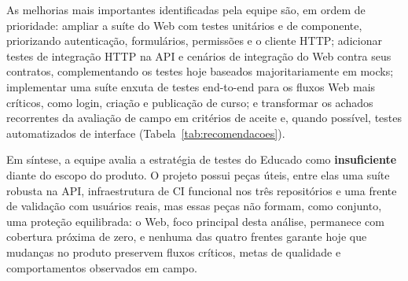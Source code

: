 As melhorias mais importantes identificadas pela equipe são, em ordem de
prioridade: ampliar a suíte do Web com testes unitários e de componente,
priorizando autenticação, formulários, permissões e o cliente HTTP;
adicionar testes de integração HTTP na API e cenários de integração do
Web contra seus contratos, complementando os testes hoje baseados
majoritariamente em mocks; implementar uma suíte enxuta de testes
end-to-end para os fluxos Web mais críticos, como login, criação e
publicação de curso; e transformar os achados recorrentes da avaliação
de campo em critérios de aceite e, quando possível, testes automatizados
de interface (Tabela~\ref{tab:recomendacoes}).

Em síntese, a equipe avalia a estratégia de testes do Educado como
\textbf{insuficiente} diante do escopo do produto. O projeto possui
peças úteis, entre elas uma suíte robusta na API, infraestrutura de CI
funcional nos três repositórios e uma frente de validação com usuários
reais, mas essas peças não formam, como conjunto, uma proteção
equilibrada: o Web, foco principal desta análise, permanece com
cobertura próxima de zero, e nenhuma das quatro frentes garante hoje que
mudanças no produto preservem fluxos críticos, metas de qualidade e
comportamentos observados em campo.